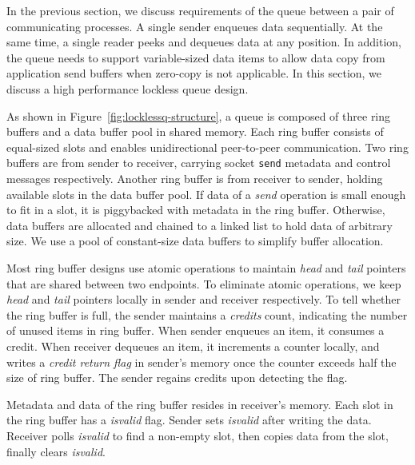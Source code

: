 In the previous section, we discuss requirements of the queue between a pair of communicating processes. A single sender enqueues data sequentially. At the same time, a single reader peeks and dequeues data at any position. In addition, the queue needs to support variable-sized data items to allow data copy from application send buffers when zero-copy is not applicable. In this section, we discuss a high performance lockless queue design.

As shown in Figure~\ref{fig:locklessq-structure}, a queue is composed of three ring buffers and a data buffer pool in shared memory. Each ring buffer consists of equal-sized slots and enables unidirectional peer-to-peer communication. Two ring buffers are from sender to receiver, carrying socket \texttt{send} metadata and control messages respectively. Another ring buffer is from receiver to sender, holding available slots in the data buffer pool. If data of a \textit{send} operation is small enough to fit in a slot, it is piggybacked with metadata in the ring buffer. Otherwise, data buffers are allocated and chained to a linked list to hold data of arbitrary size. We use a pool of constant-size data buffers to simplify buffer allocation.

Most ring buffer designs use atomic operations to maintain \textit{head} and \textit{tail} pointers that are shared between two endpoints. To eliminate atomic operations, we keep \textit{head} and \textit{tail} pointers locally in sender and receiver respectively.
To tell whether the ring buffer is full, the sender maintains a \textit{credits} count, indicating the number of unused items in ring buffer. When sender enqueues an item, it consumes a credit. When receiver dequeues an item, it increments a counter locally, and writes a \textit{credit return flag} in sender's memory once the counter exceeds half the size of ring buffer. The sender regains credits upon detecting the flag.

Metadata and data of the ring buffer resides in receiver's memory. Each slot in the ring buffer has a \textit{isvalid} flag. Sender sets \textit{isvalid} after writing the data. Receiver polls \textit{isvalid} to find a non-empty slot, then copies data from the slot, finally clears \textit{isvalid}.

